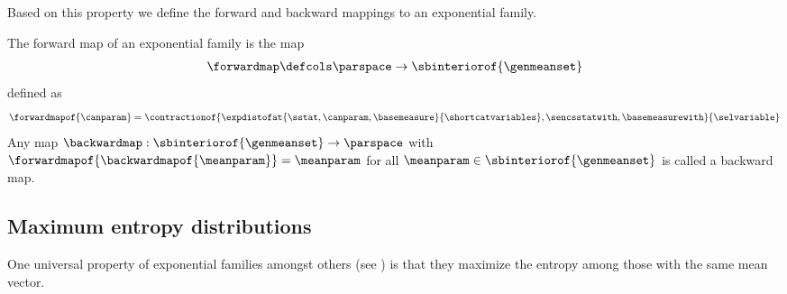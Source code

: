 Based on this property we define the forward and backward mappings to an exponential family.

\begin{definition}\label{def:forwardBackwardMapping}
    The forward map of an exponential family is the map
    \begin{align*}
        \forwardmap  \defcols \parspace \rightarrow \sbinteriorof{\genmeanset}
    \end{align*}
    defined as
    \begin{align*}
        \forwardmapof{\canparam}
        = \contractionof{\expdistofat{\sstat,\canparam,\basemeasure}{\shortcatvariables},\sencsstatwith,\basemeasurewith}{\selvariable}
    \end{align*}
    Any map $\backwardmap: \sbinteriorof{\genmeanset}\rightarrow \parspace$ with $\forwardmapof{\backwardmapof{\meanparam}}=\meanparam$ for all $\meanparam\in\sbinteriorof{\genmeanset}$ is called a backward map.
\end{definition}

\subsection{Maximum entropy distributions}

One universal property of exponential families amongst others (see \cite{murphy_probabilistic_2023}) is that they maximize the entropy among those with the same mean vector.

